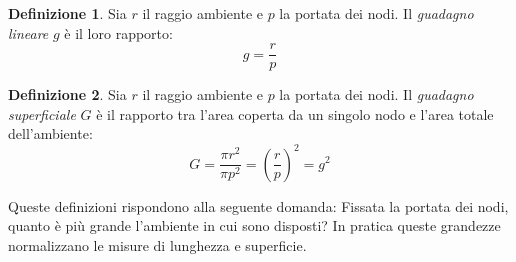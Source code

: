 \documentclass[a4paper,12pt]{article}
\theoremstyle{definition}
\newtheorem{definition}{Definizione}
\begin{document}
\begin{definition}
Sia $r$ il raggio ambiente e $p$ la portata dei nodi. Il \emph{guadagno lineare} $g$ è il loro rapporto:
$$ g = \frac{r}{p} $$
\end{definition}

\begin{definition}
Sia $r$ il raggio ambiente e $p$ la portata dei nodi. Il \emph{guadagno superficiale} $G$ è il rapporto tra l'area coperta da un singolo nodo e l'area totale dell'ambiente:
$$ G = \frac{\pi r^2}{\pi p^2} = \left(\frac{r}{p}\right)^2 = g^2 $$
\end{definition}

Queste definizioni rispondono alla seguente domanda: Fissata la portata dei nodi, quanto è più grande l'ambiente in cui sono disposti? In pratica queste grandezze normalizzano le misure di lunghezza e superficie. 
\end{document}
